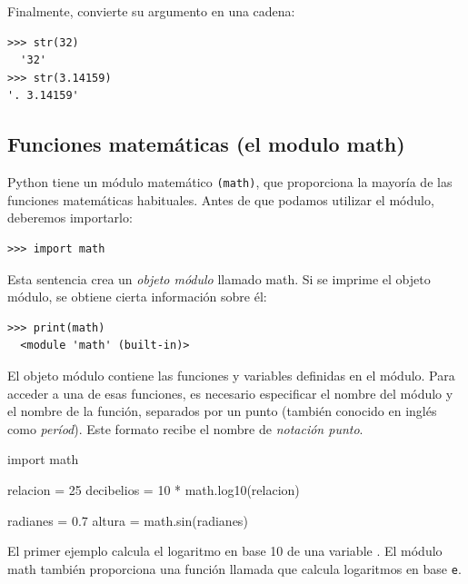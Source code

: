 Finalmente,  convierte su argumento en una cadena:

 

\begin{Verbatim}[frame=single]
>>> str(32)
  '32'
>>> str(3.14159)
'. 3.14159'
\end{Verbatim}

\hypertarget{funciones-matemuxe1ticas}{%
\subsection{Funciones matemáticas (el modulo math)}\label{funciones-matemuxe1ticas}}

  

Python tiene un módulo matemático \texttt{(math)}, que proporciona la
mayoría de las funciones matemáticas habituales. Antes de que podamos
utilizar el módulo, deberemos importarlo:

\begin{Verbatim}[frame=single]
>>> import math
\end{Verbatim}

Esta sentencia crea un \emph{objeto módulo} llamado math. Si se imprime
el objeto módulo, se obtiene cierta información sobre él:

\begin{Verbatim}[frame=single]
>>> print(math)
  <module 'math' (built-in)>
\end{Verbatim}

El objeto módulo contiene las funciones y variables definidas en el
módulo. Para acceder a una de esas funciones, es necesario especificar
el nombre del módulo y el nombre de la función, separados por un punto
(también conocido en inglés como \emph{períod}). Este formato recibe el
nombre de \emph{notación punto}.


\begin{python}[frame=single]
import math

relacion = 25
decibelios = 10 * math.log10(relacion)

radianes = 0.7
altura = math.sin(radianes)
\end{python}

El primer ejemplo calcula el logaritmo en base 10 de una variable . El módulo math también proporciona una función llamada
 que calcula logaritmos en base \texttt{e}.

